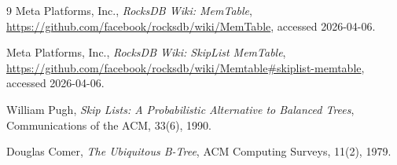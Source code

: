 \documentclass[11pt,a4paper]{article}
\begin{document}
\begin{thebibliography}{9}
Meta Platforms, Inc.,
\textit{RocksDB Wiki: MemTable},
\url{https://github.com/facebook/rocksdb/wiki/MemTable},
accessed 2026-04-06.

Meta Platforms, Inc.,
\textit{RocksDB Wiki: SkipList MemTable},
\url{https://github.com/facebook/rocksdb/wiki/Memtable#skiplist-memtable},
accessed 2026-04-06.

William Pugh,
\textit{Skip Lists: A Probabilistic Alternative to Balanced Trees},
Communications of the ACM, 33(6), 1990.

Douglas Comer,
\textit{The Ubiquitous B-Tree},
ACM Computing Surveys, 11(2), 1979.
\end{thebibliography}
\end{document}
